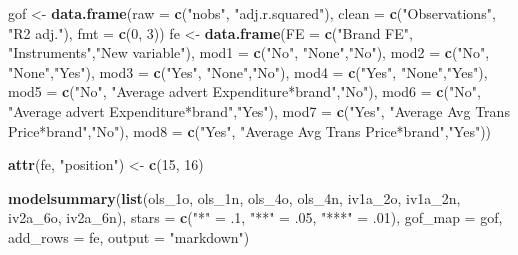 \documentclass[
]{article}
\newenvironment{Shaded}{\begin{snugshade}}{\end{snugshade}}
\newcommand{\AttributeTok}[1]{\textcolor[rgb]{0.13,0.29,0.53}{#1}}
\newcommand{\DecValTok}[1]{\textcolor[rgb]{0.00,0.00,0.81}{#1}}
\newcommand{\FunctionTok}[1]{\textcolor[rgb]{0.13,0.29,0.53}{\textbf{#1}}}
\newcommand{\NormalTok}[1]{#1}
\newcommand{\OtherTok}[1]{\textcolor[rgb]{0.56,0.35,0.01}{#1}}
\newcommand{\StringTok}[1]{\textcolor[rgb]{0.31,0.60,0.02}{#1}}
\begin{document}
\begin{Shaded}
\begin{Highlighting}[]
\NormalTok{gof }\OtherTok{\textless{}{-}} \FunctionTok{data.frame}\NormalTok{(}\AttributeTok{raw =} \FunctionTok{c}\NormalTok{(}\StringTok{"nobs"}\NormalTok{, }\StringTok{"adj.r.squared"}\NormalTok{),}
                  \AttributeTok{clean =} \FunctionTok{c}\NormalTok{(}\StringTok{"Observations"}\NormalTok{, }\StringTok{"R2 adj."}\NormalTok{),}
                  \AttributeTok{fmt =} \FunctionTok{c}\NormalTok{(}\DecValTok{0}\NormalTok{, }\DecValTok{3}\NormalTok{))}
\NormalTok{fe }\OtherTok{\textless{}{-}} \FunctionTok{data.frame}\NormalTok{(}\AttributeTok{FE =} \FunctionTok{c}\NormalTok{(}\StringTok{"Brand FE"}\NormalTok{, }\StringTok{"Instruments"}\NormalTok{,}\StringTok{"New variable"}\NormalTok{),}
                 \AttributeTok{mod1 =} \FunctionTok{c}\NormalTok{(}\StringTok{"No"}\NormalTok{, }\StringTok{"None"}\NormalTok{,}\StringTok{"No"}\NormalTok{),}
                 \AttributeTok{mod2 =} \FunctionTok{c}\NormalTok{(}\StringTok{"No"}\NormalTok{, }\StringTok{"None"}\NormalTok{,}\StringTok{"Yes"}\NormalTok{),}
                 \AttributeTok{mod3 =} \FunctionTok{c}\NormalTok{(}\StringTok{"Yes"}\NormalTok{, }\StringTok{"None"}\NormalTok{,}\StringTok{"No"}\NormalTok{),}
                 \AttributeTok{mod4 =} \FunctionTok{c}\NormalTok{(}\StringTok{"Yes"}\NormalTok{, }\StringTok{"None"}\NormalTok{,}\StringTok{"Yes"}\NormalTok{),}
                 \AttributeTok{mod5 =} \FunctionTok{c}\NormalTok{(}\StringTok{"No"}\NormalTok{, }\StringTok{"Average advert Expenditure*brand"}\NormalTok{,}\StringTok{"No"}\NormalTok{),}
                 \AttributeTok{mod6 =} \FunctionTok{c}\NormalTok{(}\StringTok{"No"}\NormalTok{, }\StringTok{"Average advert Expenditure*brand"}\NormalTok{,}\StringTok{"Yes"}\NormalTok{),}
                 \AttributeTok{mod7 =} \FunctionTok{c}\NormalTok{(}\StringTok{"Yes"}\NormalTok{, }\StringTok{"Average Avg Trans Price*brand"}\NormalTok{,}\StringTok{"No"}\NormalTok{),}
                 \AttributeTok{mod8 =} \FunctionTok{c}\NormalTok{(}\StringTok{"Yes"}\NormalTok{, }\StringTok{"Average Avg Trans Price*brand"}\NormalTok{,}\StringTok{"Yes"}\NormalTok{))}
                 

\FunctionTok{attr}\NormalTok{(fe, }\StringTok{"position"}\NormalTok{) }\OtherTok{\textless{}{-}} \FunctionTok{c}\NormalTok{(}\DecValTok{15}\NormalTok{, }\DecValTok{16}\NormalTok{)}

\FunctionTok{modelsummary}\NormalTok{(}\FunctionTok{list}\NormalTok{(ols\_1o, ols\_1n, ols\_4o, ols\_4n, iv1a\_2o, iv1a\_2n, iv2a\_6o, iv2a\_6n),}
              \AttributeTok{stars =} \FunctionTok{c}\NormalTok{(}\StringTok{"*"} \OtherTok{=}\NormalTok{ .}\DecValTok{1}\NormalTok{, }\StringTok{"**"} \OtherTok{=}\NormalTok{ .}\DecValTok{05}\NormalTok{, }\StringTok{"***"} \OtherTok{=}\NormalTok{ .}\DecValTok{01}\NormalTok{),}
              \AttributeTok{gof\_map =}\NormalTok{ gof, }\AttributeTok{add\_rows =}\NormalTok{ fe, }\AttributeTok{output =} \StringTok{"markdown"}\NormalTok{)}
\end{Highlighting}
\end{Shaded}
\end{document}
